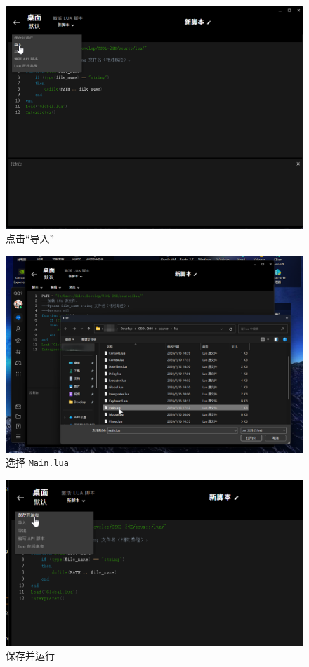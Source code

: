 \begin{figure}[H]
    \Centering
    \includegraphics[width=\textwidth]{docs/assets/import.png}
    \caption{点击“导入”}
\end{figure}

\begin{figure}[H]
    \Centering
    \includegraphics[width=\textwidth]{docs/assets/main.png}
    \caption{选择 \lstinline{Main.lua}}
\end{figure}

\begin{figure}[H]
    \Centering
    \includegraphics[width=\textwidth]{docs/assets/save_and_run.png}
    \caption{保存并运行}
\end{figure}


